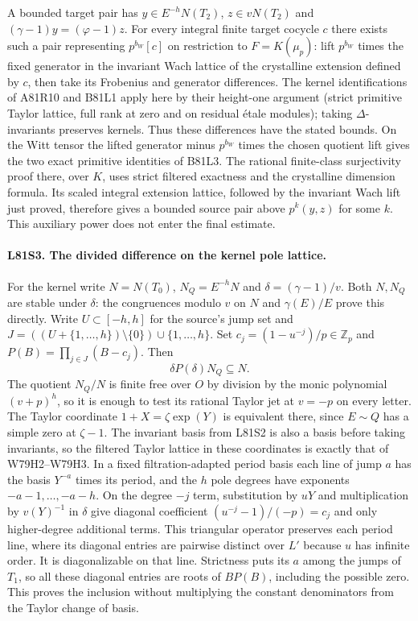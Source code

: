 A bounded target pair has $y\in E^{-h}N(T_2)$, $z\in vN(T_2)$
and $(\gamma-1)y=(\varphi-1)z$. For every integral finite
target cocycle $c$ there exists such a pair representing
$p^{b_W}[c]$ on restriction to $F=K(\mu_p)$: lift $p^{b_W}$
times the fixed generator in the invariant Wach lattice of the
crystalline extension defined by $c$, then take its Frobenius
and generator differences. The kernel identifications of A81R10
and B81L1 apply here by their height-one argument (strict
primitive Taylor lattice, full rank at zero and on residual
\'etale modules); taking $\Delta$-invariants preserves kernels.
Thus these differences have the stated bounds. On the Witt tensor
the lifted generator minus $p^{b_W}$ times the chosen quotient
lift gives the two exact primitive identities of B81L3.
The rational finite-class surjectivity proof there, over $K$,
uses strict filtered exactness and the crystalline dimension
formula. Its scaled integral extension lattice, followed by the
invariant Wach lift just proved, therefore gives a bounded
source pair above $p^k(y,z)$ for some $k$. This auxiliary power
does not enter the final estimate.

\paragraph{L81S3. The divided difference on the kernel pole lattice.}
For the kernel write $N=N(T_0)$, $N_Q=E^{-h}N$ and
$\delta=(\gamma-1)/v$. Both $N,N_Q$ are stable under $\delta$:
the congruences modulo $v$ on $N$ and $\gamma(E)/E$ prove
this directly. Write $U\subset[-h,h]$ for the source's jump set
and $J=((U+\{1,\ldots,h\})\setminus\{0\})\cup\{1,\ldots,h\}$.
Set $c_j=(1-u^{-j})/p\in\mathbb Z_p$ and
$P(B)=\prod_{j\in J}(B-c_j)$. Then
\[
                    \delta P(\delta)N_Q\subseteq N .
\]
The quotient $N_Q/N$ is finite free over $O$ by division by
the monic polynomial $(v+p)^h$, so it is enough to test its
rational Taylor jet at $v=-p$ on every letter. The Taylor
coordinate $1+X=\zeta\exp(Y)$ is equivalent there, since
$E\sim Q$ has a simple zero at $\zeta-1$. The invariant basis
from L81S2 is also a basis before taking invariants, so the
filtered Taylor lattice in these coordinates is exactly that of
W79H2--W79H3. In a fixed filtration-adapted period basis each
line of jump $a$ has the basis $Y^{-a}$ times its period, and the
$h$ pole degrees have exponents $-a-1,\ldots,-a-h$.
On the degree $-j$ term, substitution by $uY$ and multiplication
by $v(Y)^{-1}$ in $\delta$ give diagonal coefficient
$(u^{-j}-1)/(-p)=c_j$ and only higher-degree additional terms.
This triangular operator preserves each period line, where its
diagonal entries are pairwise distinct over $L'$ because $u$
has infinite order. It is diagonalizable on that line.
Strictness puts its $a$ among the jumps of $T_1$, so all these
diagonal entries are roots of $BP(B)$, including the possible
zero. This proves the inclusion without multiplying the constant
denominators from the Taylor change of basis.

